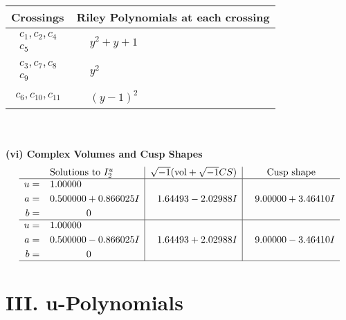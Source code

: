 \documentclass[1p]{elsarticle_modified}
\theoremstyle{definition}
\newcommand{\I}{\sqrt{-1}}
\begin{document}
\begin{tabular}{m{50pt}|m{274pt}}
Crossings & \hspace{64pt}Riley Polynomials at each crossing \\
\hline $$\begin{aligned}c_{1},c_{2},c_{4}\\c_{5}\end{aligned}$$&$\begin{aligned}
&y^2+y+1
\end{aligned}$\\
\hline $$\begin{aligned}c_{3},c_{7},c_{8}\\c_{9}\end{aligned}$$&$\begin{aligned}
&y^2
\end{aligned}$\\
\hline $$\begin{aligned}c_{6},c_{10},c_{11}\end{aligned}$$&$\begin{aligned}
&(y-1)^2
\end{aligned}$\\
\hline
\end{tabular}\\~\\
\newpage\flushleft \textbf{(vi) Complex Volumes and Cusp Shapes}
$$\begin{array}{c|c|c}  
\text{Solutions to }I^u_{2}& \I (\text{vol} + \sqrt{-1}CS) & \text{Cusp shape}\\
 \hline 
\begin{aligned}
u &= \phantom{-}1.00000\phantom{ +0.000000I} \\
a &= \phantom{-}0.500000 + 0.866025 I \\
b &= \phantom{-0.000000 } 0\end{aligned}
 & \phantom{-}1.64493 - 2.02988 I & \phantom{-}9.00000 + 3.46410 I \\ \hline\begin{aligned}
u &= \phantom{-}1.00000\phantom{ +0.000000I} \\
a &= \phantom{-}0.500000 - 0.866025 I \\
b &= \phantom{-0.000000 } 0\end{aligned}
 & \phantom{-}1.64493 + 2.02988 I & \phantom{-}9.00000 - 3.46410 I\\
 \hline 
 \end{array}$$\newpage
\newpage\renewcommand{\arraystretch}{1}
\centering \section*{ III. u-Polynomials}
\end{document}
